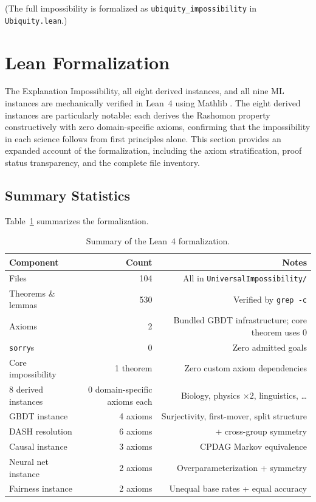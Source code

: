 \documentclass[11pt,a4paper]{article}
\begin{document}
(The full impossibility is formalized as \texttt{ubiquity\_impossibility}
in \texttt{Ubiquity.lean}.)

\section{Lean Formalization}
\label{sec:lean}

The Explanation Impossibility, all eight derived instances, and all nine ML
instances are mechanically verified in Lean~4 \citep{demoura2021lean4} using
Mathlib \citep{mathlib2020}.  The eight derived instances are particularly
notable: each derives the Rashomon property constructively with zero domain-specific axioms,
confirming that the impossibility in each science follows from first
principles alone.  This section provides an expanded account of the
formalization, including the axiom stratification, proof status transparency,
and the complete file inventory.

\subsection{Summary Statistics}

Table~\ref{tab:lean-summary} summarizes the formalization.

\begin{table}[ht]
\centering
\caption{Summary of the Lean~4 formalization.}
\label{tab:lean-summary}
\begin{tabular}{lrr}
\toprule
Component & Count & Notes \\
\midrule
Files & 104 & All in \texttt{UniversalImpossibility/} \\
Theorems \& lemmas & 530 & Verified by \texttt{grep -c} \\
Axioms & 2 & Bundled GBDT infrastructure; core theorem uses 0 \\
\texttt{sorry}s & 0 & Zero admitted goals \\
\midrule
Core impossibility & 1 theorem & Zero custom axiom dependencies \\
8 derived instances & 0 domain-specific axioms each & Biology, physics $\times 2$, linguistics, \ldots \\
GBDT instance & 4 axioms & Surjectivity, first-mover, split structure \\
DASH resolution & 6 axioms & + cross-group symmetry \\
Causal instance & 3 axioms & CPDAG Markov equivalence \\
Neural net instance & 2 axioms & Overparameterization + symmetry \\
Fairness instance & 2 axioms & Unequal base rates + equal accuracy \\
\bottomrule
\end{tabular}
\end{table}
\end{document}
